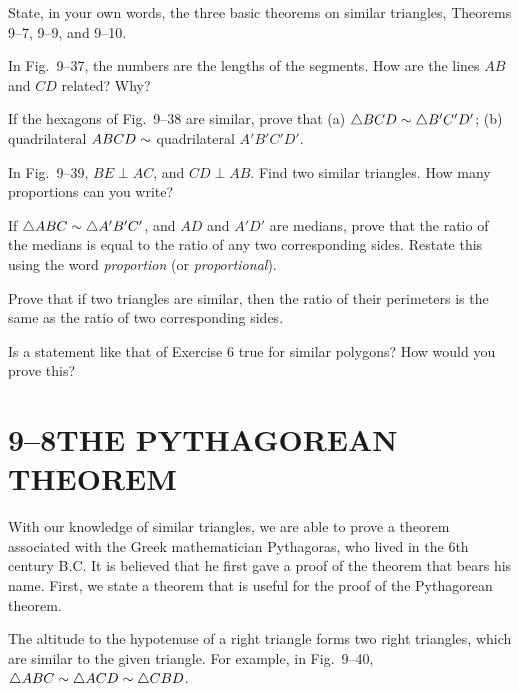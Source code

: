 \documentclass[11pt]{book}
\begin{document}
\begin{exercisecols}
\begin{exlist}
\item State, in your own words, the three basic theorems on similar triangles,
      Theorems 9--7, 9--9, and 9--10.
\item In Fig.~9--37, the numbers are the lengths of the segments. How are the
      lines $AB$ and $CD$ related? Why?
\exfig{\FIGIXTHIRTYSEVEN}
\item If the hexagons of Fig.~9--38 are similar, prove that (a) $\triangle BCD \sim
      \triangle B'C'D'$; (b) quadrilateral $ABCD \sim$ quadrilateral $A'B'C'D'$.
\exfig{\FIGIXTHIRTYEIGHT}
\item In Fig.~9--39, $BE \perp AC$, and $CD \perp AB$. Find two similar
      triangles. How many proportions can you write?
\exfig{\FIGIXTHIRTYNINE}
\item If $\triangle ABC \sim \triangle A'B'C'$, and $AD$ and $A'D'$ are medians, prove
      that the ratio of the medians is equal to the ratio of any two
      corresponding sides. Restate this using the word \emph{proportion} (or
      \emph{proportional}).
\item Prove that if two triangles are similar, then the ratio of their perimeters
      is the same as the ratio of two corresponding sides.
\item Is a statement like that of Exercise 6 true for similar polygons? How would
      you prove this?
\end{exlist}
\end{exercisecols}

\section*{9--8\quad THE PYTHAGOREAN THEOREM}

With our knowledge of similar triangles, we are able to prove a theorem
associated with the Greek mathematician Pythagoras, who lived in the 6th century
B.C. It is believed that he first gave a proof of the theorem that bears his
name. First, we state a theorem that is useful for the proof of the Pythagorean
theorem.

\begin{theorem}
The altitude to the hypotenuse of a right triangle forms two right triangles,
which are similar to the given triangle. For example, in Fig.~9--40,
$\triangle ABC \sim \triangle ACD \sim \triangle CBD$.
\end{theorem}
\end{document}
